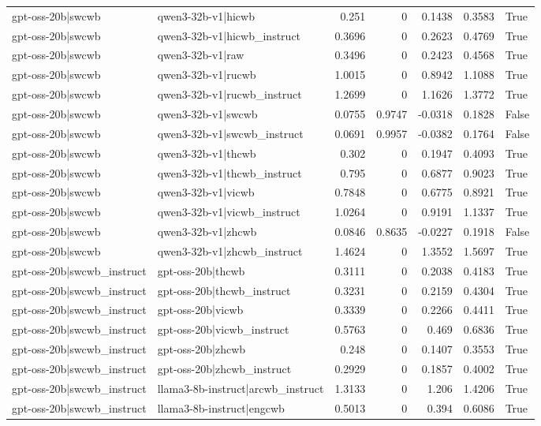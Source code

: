 \begin{table}
\begin{tabular}{l l r r r r l}
gpt-oss-20b|swcwb & qwen3-32b-v1|hicwb & 0.251 & 0 & 0.1438 & 0.3583 & True \\
gpt-oss-20b|swcwb & qwen3-32b-v1|hicwb_instruct & 0.3696 & 0 & 0.2623 & 0.4769 & True \\
gpt-oss-20b|swcwb & qwen3-32b-v1|raw & 0.3496 & 0 & 0.2423 & 0.4568 & True \\
gpt-oss-20b|swcwb & qwen3-32b-v1|rucwb & 1.0015 & 0 & 0.8942 & 1.1088 & True \\
gpt-oss-20b|swcwb & qwen3-32b-v1|rucwb_instruct & 1.2699 & 0 & 1.1626 & 1.3772 & True \\
gpt-oss-20b|swcwb & qwen3-32b-v1|swcwb & 0.0755 & 0.9747 & -0.0318 & 0.1828 & False \\
gpt-oss-20b|swcwb & qwen3-32b-v1|swcwb_instruct & 0.0691 & 0.9957 & -0.0382 & 0.1764 & False \\
gpt-oss-20b|swcwb & qwen3-32b-v1|thcwb & 0.302 & 0 & 0.1947 & 0.4093 & True \\
gpt-oss-20b|swcwb & qwen3-32b-v1|thcwb_instruct & 0.795 & 0 & 0.6877 & 0.9023 & True \\
gpt-oss-20b|swcwb & qwen3-32b-v1|vicwb & 0.7848 & 0 & 0.6775 & 0.8921 & True \\
gpt-oss-20b|swcwb & qwen3-32b-v1|vicwb_instruct & 1.0264 & 0 & 0.9191 & 1.1337 & True \\
gpt-oss-20b|swcwb & qwen3-32b-v1|zhcwb & 0.0846 & 0.8635 & -0.0227 & 0.1918 & False \\
gpt-oss-20b|swcwb & qwen3-32b-v1|zhcwb_instruct & 1.4624 & 0 & 1.3552 & 1.5697 & True \\
gpt-oss-20b|swcwb_instruct & gpt-oss-20b|thcwb & 0.3111 & 0 & 0.2038 & 0.4183 & True \\
gpt-oss-20b|swcwb_instruct & gpt-oss-20b|thcwb_instruct & 0.3231 & 0 & 0.2159 & 0.4304 & True \\
gpt-oss-20b|swcwb_instruct & gpt-oss-20b|vicwb & 0.3339 & 0 & 0.2266 & 0.4411 & True \\
gpt-oss-20b|swcwb_instruct & gpt-oss-20b|vicwb_instruct & 0.5763 & 0 & 0.469 & 0.6836 & True \\
gpt-oss-20b|swcwb_instruct & gpt-oss-20b|zhcwb & 0.248 & 0 & 0.1407 & 0.3553 & True \\
gpt-oss-20b|swcwb_instruct & gpt-oss-20b|zhcwb_instruct & 0.2929 & 0 & 0.1857 & 0.4002 & True \\
gpt-oss-20b|swcwb_instruct & llama3-8b-instruct|arcwb_instruct & 1.3133 & 0 & 1.206 & 1.4206 & True \\
gpt-oss-20b|swcwb_instruct & llama3-8b-instruct|engcwb & 0.5013 & 0 & 0.394 & 0.6086 & True \\

\end{tabular}
\end{table}
